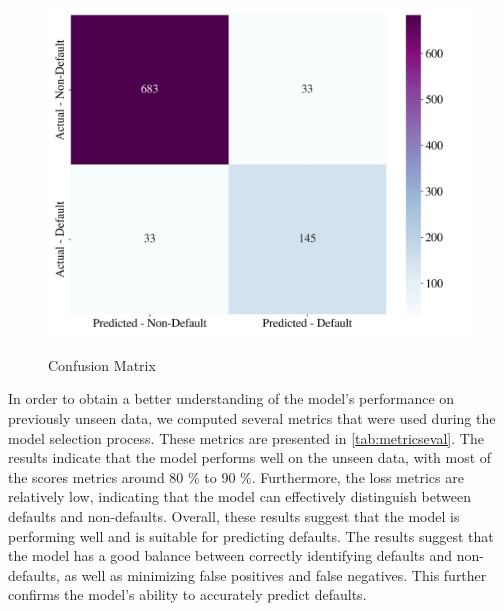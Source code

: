 \begin{figure}[H]
\centering
\caption{Confusion Matrix}\vspace{0.5em}
\label{fig:confmat}\
\includegraphics[width=130mm]{Figures/Confusion_Matrix.jpg}

\vspace{-1em}
\end{figure}

In order to obtain a better understanding of the model's performance on previously unseen data, we computed several metrics that were used during the model selection process.
These metrics are presented in \autoref{tab:metricseval}. The results indicate that the model performs well on the unseen data, with most of the scores metrics around 80 \% to 90 \%.
Furthermore, the loss metrics are relatively low, indicating that the model can effectively distinguish between defaults and non-defaults.
Overall, these results suggest that the model is performing well and is suitable for predicting defaults.
The results suggest that the model has a good balance between correctly identifying defaults and non-defaults, as well as minimizing false positives and false negatives. This further confirms the model's ability to accurately predict defaults.

